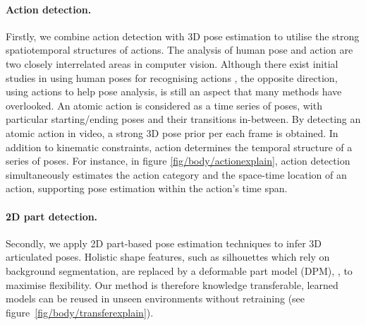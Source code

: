 \paragraph{Action detection.} Firstly, we combine action detection with 3D pose estimation to utilise the strong spatiotemporal structures of actions.
The analysis of human pose and action are two closely interrelated areas in computer vision. Although there exist initial studies in using human poses for recognising actions \eg \cite{Yao2012, Wang2012}, the opposite direction, \ie using actions to help pose analysis, 
is still an aspect that many methods have overlooked. 
An atomic action is considered as a time series of poses, with particular starting/ending poses and their transitions in-between. By detecting an atomic action in video,  a strong 3D pose prior per each frame is obtained. 
In addition to kinematic constraints, action determines the temporal structure of a series of poses. For instance, in figure \ref{fig/body/actionexplain}, action detection simultaneously estimates the action category and the space-time location of an action, supporting pose estimation within the action's time span.
\paragraph{2D part detection.} Secondly, we apply 2D part-based pose estimation techniques to infer 3D articulated poses. 
Holistic shape features, such as silhouettes which rely on background segmentation, are replaced by a deformable part model (DPM), \eg \cite{Yang2011}, to maximise flexibility. Our method is therefore knowledge transferable, learned models can be reused in unseen environments without retraining (see figure~\ref{fig/body/transferexplain}). 

